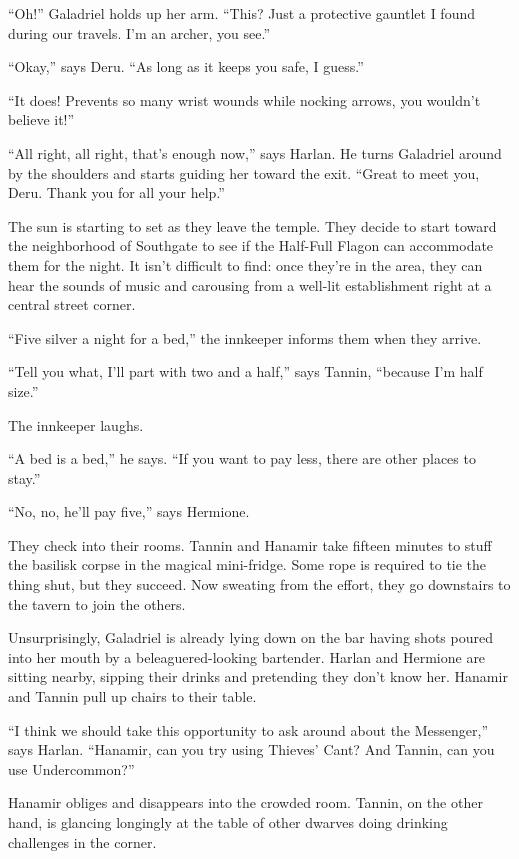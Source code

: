 \documentclass[smalldemyvopaper,11pt,twoside,onecolumn,openright,extrafontsizes]{memoir}
\begin{document}
``Oh!'' Galadriel holds up her arm. ``This? Just a protective gauntlet I
found during our travels. I'm an archer, you see.''

``Okay,'' says Deru. ``As long as it keeps you safe, I guess.''

``It does! Prevents so many wrist wounds while nocking arrows, you
wouldn't believe it!''

``All right, all right, that's enough now,'' says Harlan. He turns
Galadriel around by the shoulders and starts guiding her toward the
exit. ``Great to meet you, Deru. Thank you for all your help.''

The sun is starting to set as they leave the temple. They decide to
start toward the neighborhood of Southgate to see if the Half-Full
Flagon can accommodate them for the night. It isn't difficult to find:
once they're in the area, they can hear the sounds of music and
carousing from a well-lit establishment right at a central street
corner.

``Five silver a night for a bed,'' the innkeeper informs them when they
arrive.

``Tell you what, I'll part with two and a half,'' says Tannin, ``because
I'm half size.''

The innkeeper laughs.

``A bed is a bed,'' he says. ``If you want to pay less, there are other
places to stay.''

``No, no, he'll pay five,'' says Hermione.

They check into their rooms. Tannin and Hanamir take fifteen minutes to
stuff the basilisk corpse in the magical mini-fridge. Some rope is
required to tie the thing shut, but they succeed. Now sweating from the
effort, they go downstairs to the tavern to join the others.

Unsurprisingly, Galadriel is already lying down on the bar having shots
poured into her mouth by a beleaguered-looking bartender. Harlan and
Hermione are sitting nearby, sipping their drinks and pretending they
don't know her. Hanamir and Tannin pull up chairs to their table.

``I think we should take this opportunity to ask around about the
Messenger,'' says Harlan. ``Hanamir, can you try using Thieves' Cant?
And Tannin, can you use Undercommon?''

Hanamir obliges and disappears into the crowded room. Tannin, on the
other hand, is glancing longingly at the table of other dwarves doing
drinking challenges in the corner.
\end{document}
